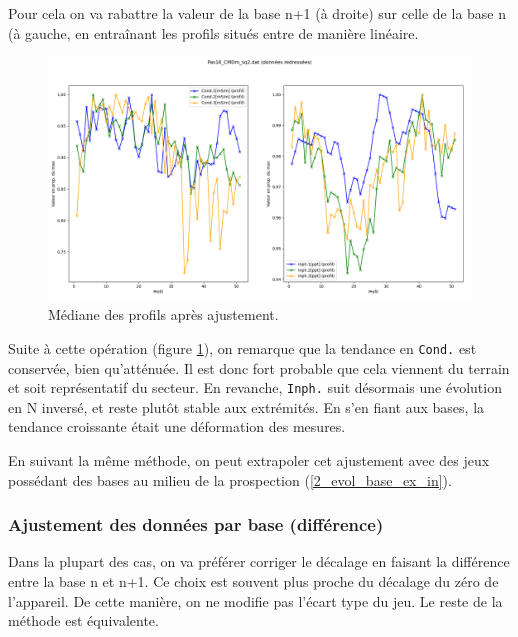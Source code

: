 \documentclass[12pt]{article}
\begin{document}
    Pour cela on va rabattre la valeur de la base n+1 (à droite) sur celle de la base n (à gauche, en entraînant les profils situés entre de manière linéaire.

    \begin{figure}[ht!]
        \centering
        \includegraphics[width=\textwidth]{Images/Base_Apres_sq2.png}  
        \caption{Médiane des profils après ajustement.}
        \label{fig:2_evol_base_im}
    \end{figure}

    Suite à cette opération (figure \ref{fig:2_evol_base_im}), on remarque que la tendance en \texttt{Cond.} est conservée, bien qu'atténuée. Il est donc fort probable que cela viennent du terrain et soit représentatif du secteur. En revanche, \texttt{Inph.} suit désormais une évolution en N inversé, et reste plutôt stable aux extrémités. En s'en fiant aux bases, la tendance croissante était une déformation des mesures.

    \label{2_evol_base_ex_out} En suivant la même méthode, on peut extrapoler cet ajustement avec des jeux possédant des bases au milieu de la prospection (\ref{2_evol_base_ex_in}).

\newpage
\subsubsection{Ajustement des données par base (différence)}

    Dans la plupart des cas, on va préférer corriger le décalage en faisant la différence entre la base n et n+1. Ce choix est souvent plus proche du décalage du zéro de l'appareil. De cette manière, on ne modifie pas l'écart type du jeu. Le reste de la méthode est équivalente.
\end{document}
